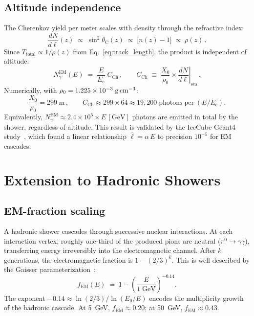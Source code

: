 \documentclass[11pt]{article}
\newcommand{\Ec}{E_{\mathrm{c}}}
\newcommand{\fEM}{f_{\mathrm{EM}}}
\newcommand{\CCH}{C_{\mathrm{Ch}}}
\newcommand{\thetaC}{\theta_{\mathrm{C}}}
\begin{document}
\subsection{Altitude independence}

The Cherenkov yield per meter scales with density through the refractive
index:
\begin{equation}
  \frac{dN}{d\ell}(z) \;\propto\; \sin^2\!\thetaC(z) \;\propto\;
  \bigl[n(z) - 1\bigr] \;\propto\; \rho(z)\,.
\end{equation}
Since $T_{\mathrm{total}} \propto 1/\rho(z)$ from
Eq.~\eqref{eq:track_length}, the product is independent of altitude:
\begin{equation}
  \boxed{
  N_{\gamma}^{\mathrm{EM}}(E)
  \;=\;
  \frac{E}{\Ec}\;\CCH\,,
  \qquad
  \CCH \;\equiv\;
  \frac{X_0}{\rho_0}
  \times
  \left.\frac{dN}{d\ell}\right|_{\text{sea}}\,.
  }
  \label{eq:C_CH}
\end{equation}
Numerically, with $\rho_0 = 1.225 \times 10^{-3}\;\text{g\,cm}^{-3}$:
\begin{equation}
  \frac{X_0}{\rho_0} = 299\;\text{m}\,,
  \qquad
  \CCH \approx 299 \times 64 \approx 19{,}200\;\text{photons}\;\text{per}\;(E/\Ec).
  \label{eq:C_CH_value}
\end{equation}
Equivalently, $N_{\gamma}^{\mathrm{EM}} \approx 2.4 \times 10^5 \times
E\,[\text{GeV}]$ photons are emitted in total by the shower, regardless
of altitude.  This result is validated by the IceCube Geant4
study~\cite{IceCube2013}, which found a linear relationship
$\hat\ell = \alpha\,E$ to precision $10^{-5}$ for EM cascades.

\section{Extension to Hadronic Showers}
\label{sec:hadronic}

\subsection{EM-fraction scaling}

A hadronic shower cascades through successive nuclear interactions.  At
each interaction vertex, roughly one-third of the produced pions are
neutral ($\pi^0 \to \gamma\gamma$), transferring energy irreversibly
into the electromagnetic channel.  After $k$ generations, the
electromagnetic fraction is $1 - (2/3)^k$.  This is well described by
the Gaisser parameterization~\cite{Gaisser1990,Wigmans2000}:
\begin{equation}
  \fEM(E) \;=\;
  1 - \left(\frac{E}{1\;\text{GeV}}\right)^{-0.14}.
  \label{eq:f_EM}
\end{equation}
The exponent $-0.14 \approx \ln(2/3)/\ln(E_0/E)$ encodes the
multiplicity growth of the hadronic cascade.  At 5~GeV,
$\fEM \approx 0.20$; at 50~GeV, $\fEM \approx 0.43$.
\end{document}
